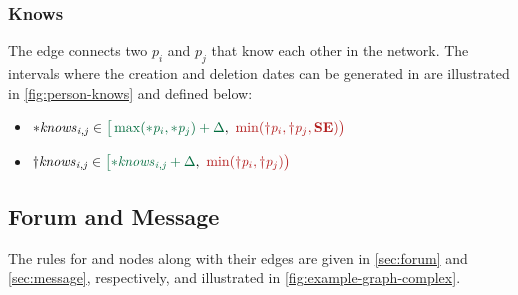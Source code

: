 
%


\subsubsection{Knows}

The \tKnows edge connects two \tPersons $p_i$ and $p_j$ that know each other in the network.
The intervals where the creation and deletion dates can be generated in are illustrated in \autoref{fig:person-knows} and defined below:
\begin{itemize}
    \item $\varc{\eKnows_{i,j}} \in \interval{\max(\varc{\ePerson}_{i},\varc{\ePerson}_{j}) + \Delta}{\min(\vard{\ePerson}_{i},\vard{\ePerson}_{j}, \xSE)}$
    \item $\vard{\eKnows_{i,j}} \in \interval{\varc{\eKnows_{i,j}} + \Delta}{\min (\vard{\ePerson}_{i}, \vard{\ePerson}_{j})}$
\end{itemize}


\subsection{Forum and Message}

The rules for \tForum and \tMessage nodes along with their edges are given in \autoref{sec:forum} and \autoref{sec:message}, respectively, and illustrated in \autoref{fig:example-graph-complex}.





